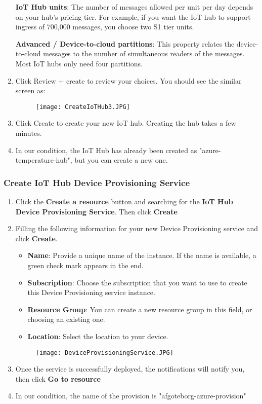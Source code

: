 \begin{enumerate}
    \textbf{IoT Hub units}: The number of messages allowed per unit per day depends on your hub's pricing tier. For example, if you want the IoT hub to support ingress of 700,000 messages, you choose two S1 tier units.
    
    \textbf{Advanced / Device-to-cloud partitions}: This property relates the device-to-cloud messages to the number of simultaneous readers of the messages. Most IoT hubs only need four partitions.
    
    \item Click Review + create to review your choices. You should see the similar screen as:
    \begin{figure}[h]
        \centering
        \texttt{[image: CreateIoTHub3.JPG]}
    \end{figure}
    
    \item Click Create to create your new IoT hub. Creating the hub takes a few minutes.
    
    \item In our condition, the IoT Hub has already been created as "azure-temperature-hub", but you can create a new one.
\end{enumerate}


\subsubsection{Create IoT Hub Device Provisioning Service}
\begin{enumerate}
    \item Click the \textbf{Create a resource} button and searching for the \textbf{IoT Hub Device Provisioning Service}. Then click \textbf{Create}
    \item Filling the following information for your new Device Provisioning service and click \textbf{Create}.
          \begin{itemize}
              \item \textbf{Name}: Provide a unique name of the instance. If the name is available, a green check mark appears in the end.
              \item \textbf{Subscription}: Choose the subscription that you want to use to create this Device Provisioning service instance.
              \item \textbf{Resource Group}: You can create a new resource group in this field, or choosing an existing one. 
              \item \textbf{Location}: Select the location to your device.
          \end{itemize}
          \begin{figure}
            \centering
            \texttt{[image: DeviceProvisioningService.JPG]}
          \end{figure}
    \item Once the service is successfully deployed, the notifications will notify you, then click \textbf{Go to resource}
    \item In our condition, the name of the provision is "afgoteborg-azure-provision"
\end{enumerate}

